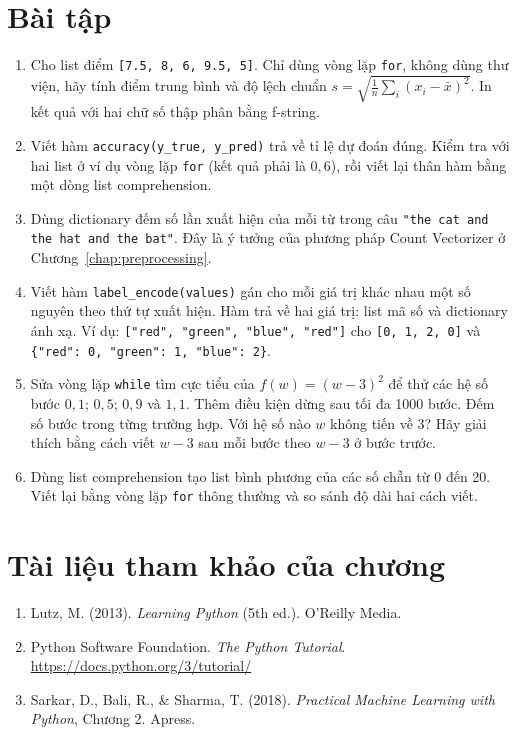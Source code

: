 \section{Bài tập}
\begin{enumerate}
    \item Cho list điểm \texttt{[7.5, 8, 6, 9.5, 5]}. Chỉ dùng vòng lặp \texttt{for}, không dùng thư viện, hãy tính điểm trung bình và độ lệch chuẩn $s = \sqrt{\frac{1}{n}\sum_i (x_i - \bar{x})^2}$. In kết quả với hai chữ số thập phân bằng f-string.
    \item Viết hàm \texttt{accuracy(y\_true, y\_pred)} trả về tỉ lệ dự đoán đúng. Kiểm tra với hai list ở ví dụ vòng lặp \texttt{for} (kết quả phải là $0{,}6$), rồi viết lại thân hàm bằng một dòng list comprehension.
    \item Dùng dictionary đếm số lần xuất hiện của mỗi từ trong câu \texttt{"the cat and the hat and the bat"}. Đây là ý tưởng của phương pháp Count Vectorizer ở Chương~\ref{chap:preprocessing}.
    \item Viết hàm \texttt{label\_encode(values)} gán cho mỗi giá trị khác nhau một số nguyên theo thứ tự xuất hiện. Hàm trả về hai giá trị: list mã số và dictionary ánh xạ. Ví dụ: \texttt{["red", "green", "blue", "red"]} cho \texttt{[0, 1, 2, 0]} và \texttt{\{"red": 0, "green": 1, "blue": 2\}}.
    \item Sửa vòng lặp \texttt{while} tìm cực tiểu của $f(w) = (w - 3)^2$ để thử các hệ số bước $0{,}1$; $0{,}5$; $0{,}9$ và $1{,}1$. Thêm điều kiện dừng sau tối đa 1000 bước. Đếm số bước trong từng trường hợp. Với hệ số nào $w$ không tiến về 3? Hãy giải thích bằng cách viết $w - 3$ sau mỗi bước theo $w - 3$ ở bước trước.
    \item Dùng list comprehension tạo list bình phương của các số chẵn từ 0 đến 20. Viết lại bằng vòng lặp \texttt{for} thông thường và so sánh độ dài hai cách viết.
\end{enumerate}

\section*{Tài liệu tham khảo của chương}
\begin{enumerate}
    \item Lutz, M. (2013). \textit{Learning Python} (5th ed.). O'Reilly Media.
    \item Python Software Foundation. \textit{The Python Tutorial}. \url{https://docs.python.org/3/tutorial/}
    \item Sarkar, D., Bali, R., \& Sharma, T. (2018). \textit{Practical Machine Learning with Python}, Chương 2. Apress.
\end{enumerate}
